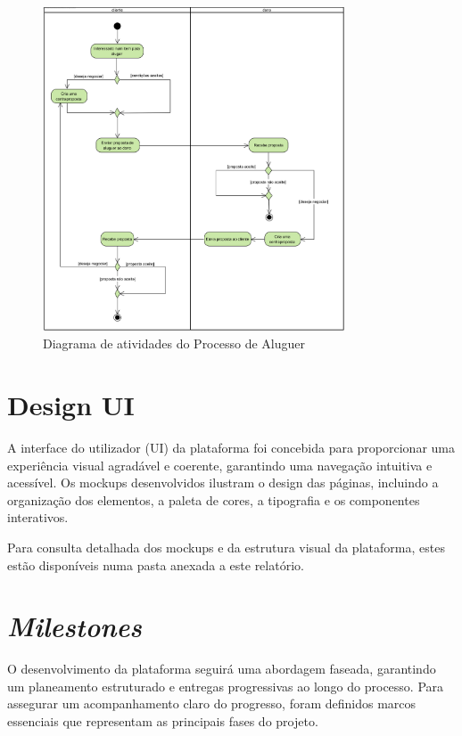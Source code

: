 \documentclass[a4paper, 12pt]{article} %
\begin{document}
\begin{figure}[ht]
	\centering
	\includegraphics[width=0.8\textwidth]{../images/activity-diagram-rentals.png}
	\caption{Diagrama de atividades do Processo de Aluguer}
	\label{fig:diagrama_atividades_aluguer}
\end{figure}

\newpage
\clearpage
\section{Design UI}
A interface do utilizador (UI) da plataforma foi concebida para proporcionar uma experiência visual agradável e coerente, garantindo uma navegação intuitiva e acessível. Os mockups desenvolvidos ilustram o design das páginas, incluindo a organização dos elementos, a paleta de cores, a tipografia e os componentes interativos.

Para consulta detalhada dos mockups e da estrutura visual da plataforma, estes estão disponíveis numa pasta anexada a este relatório.


\newpage
\section{\textit{Milestones}}
O desenvolvimento da plataforma seguirá uma abordagem faseada, garantindo um planeamento estruturado e entregas progressivas ao longo do processo. Para assegurar um acompanhamento claro do progresso, foram definidos marcos essenciais que representam as principais fases do projeto.
\end{document}
